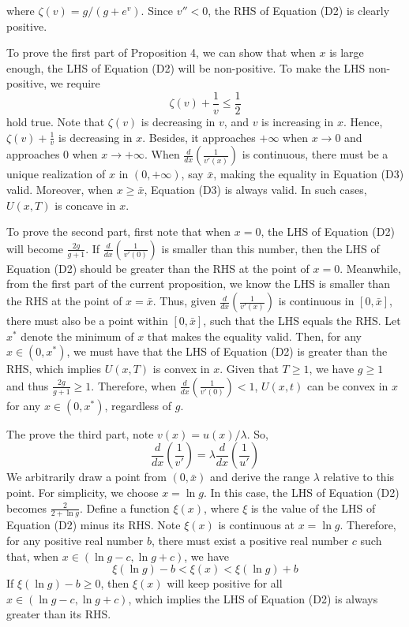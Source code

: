 \documentclass[
  12pt,
]{article}
\begin{document}
where \(\zeta(v)=g/(g+e^v)\). Since \(v''<0\), the RHS of Equation (D2)
is clearly positive.

To prove the first part of Proposition 4, we can show that when \(x\) is
large enough, the LHS of Equation (D2) will be non-positive. To make the
LHS non-positive, we require\[\tag{D3}
\zeta(v)+\frac{1}{v}\leq\frac{1}{2}
\]hold true. Note that \(\zeta(v)\) is decreasing in \(v\), and \(v\) is
increasing in \(x\). Hence, \(\zeta(v)+\frac{1}{v}\) is decreasing in
\(x\). Besides, it approaches \(+\infty\) when \(x\rightarrow0\) and
approaches 0 when \(x\rightarrow +\infty\). When
\(\frac{d}{dx}\left(\frac{1}{v'(x)}\right)\) is continuous, there must
be a unique realization of \(x\) in \((0,+\infty)\), say \(\bar{x}\),
making the equality in Equation (D3) valid. Moreover, when
\(x\geq\bar{x}\), Equation (D3) is always valid. In such cases,
\(U(x,T)\) is concave in \(x\).

To prove the second part, first note that when \(x=0\), the LHS of
Equation (D2) will become \(\frac{2g}{g+1}\). If
\(\frac{d}{dx}\left(\frac{1}{v'(0)}\right)\) is smaller than this
number, then the LHS of Equation (D2) should be greater than the RHS at
the point of \(x=0\). Meanwhile, from the first part of the current
proposition, we know the LHS is smaller than the RHS at the point of
\(x=\bar{x}\). Thus, given \(\frac{d}{dx}\left(\frac{1}{v'(x)}\right)\)
is continuous in \([0,\bar{x}]\), there must also be a point within
\([0,\bar{x}]\), such that the LHS equals the RHS. Let \(x^*\) denote
the minimum of \(x\) that makes the equality valid. Then, for any
\(x\in(0,x^*)\), we must have that the LHS of Equation (D2) is greater
than the RHS, which implies \(U(x,T)\) is convex in \(x\). Given that
\(T\geq1\), we have \(g\geq1\) and thus \(\frac{2g}{g+1}\geq 1\).
Therefore, when \(\frac{d}{dx}\left(\frac{1}{v'(0)}\right)<1\),
\(U(x,t)\) can be convex in \(x\) for any \(x\in(0,x^{*})\), regardless
of \(g\).

The prove the third part, note \(v(x)=u(x)/\lambda\). So, \[
\frac{d}{dx}\left(\frac{1}{v'}\right)=\lambda\frac{d}{dx}\left(\frac{1}{u'}\right)
\]We arbitrarily draw a point from \((0,\bar{x})\) and derive the range
\(\lambda\) relative to this point. For simplicity, we choose
\(x=\ln g\). In this case, the LHS of Equation (D2) becomes
\(\frac{2}{2+\ln g}\). Define a function \(\xi(x)\), where \(\xi\) is
the value of the LHS of Equation (D2) minus its RHS. Note \(\xi(x)\) is
continuous at \(x=\ln g\). Therefore, for any positive real number
\(b\), there must exist a positive real number \(c\) such that, when
\(x\in(\ln g-c,\ln g+c)\), we have\[\tag{D4}
\xi(\ln g)-b<\xi(x)<\xi(\ln g)+b
\]If \(\xi(\ln g)-b\geq 0\), then \(\xi(x)\) will keep positive for all
\(x\in(\ln g-c,\ln g+c)\), which implies the LHS of Equation (D2) is
always greater than its RHS.
\end{document}
